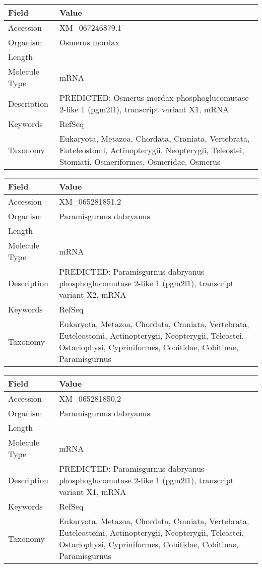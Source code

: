 \documentclass[10pt]{article}
\begin{document}
{\footnotesize
\begin{longtable}{>{\raggedright\arraybackslash}p{4.5cm} >{\raggedright\arraybackslash}p{11.5cm}}
\textbf{Field} & \textbf{Value} \\
\hline
Accession & XM\_067246879.1 \\
Organism & Osmerus mordax \\
Length & 3989 \\
Molecule Type & mRNA \\
Description & PREDICTED: Osmerus mordax phosphoglucomutase 2-like 1 (pgm2l1), transcript variant X1, mRNA \\
Keywords & RefSeq \\
Taxonomy & Eukaryota, Metazoa, Chordata, Craniata, Vertebrata, Euteleostomi, Actinopterygii, Neopterygii, Teleostei, Stomiati, Osmeriformes, Osmeridae, Osmerus \\
\end{longtable}
}

{\footnotesize
\begin{longtable}{>{\raggedright\arraybackslash}p{4.5cm} >{\raggedright\arraybackslash}p{11.5cm}}
\textbf{Field} & \textbf{Value} \\
\hline
Accession & XM\_065281851.2 \\
Organism & Paramisgurnus dabryanus \\
Length & 3599 \\
Molecule Type & mRNA \\
Description & PREDICTED: Paramisgurnus dabryanus phosphoglucomutase 2-like 1 (pgm2l1), transcript variant X2, mRNA \\
Keywords & RefSeq \\
Taxonomy & Eukaryota, Metazoa, Chordata, Craniata, Vertebrata, Euteleostomi, Actinopterygii, Neopterygii, Teleostei, Ostariophysi, Cypriniformes, Cobitidae, Cobitinae, Paramisgurnus \\
\end{longtable}
}

{\footnotesize
\begin{longtable}{>{\raggedright\arraybackslash}p{4.5cm} >{\raggedright\arraybackslash}p{11.5cm}}
\textbf{Field} & \textbf{Value} \\
\hline
Accession & XM\_065281850.2 \\
Organism & Paramisgurnus dabryanus \\
Length & 3754 \\
Molecule Type & mRNA \\
Description & PREDICTED: Paramisgurnus dabryanus phosphoglucomutase 2-like 1 (pgm2l1), transcript variant X1, mRNA \\
Keywords & RefSeq \\
Taxonomy & Eukaryota, Metazoa, Chordata, Craniata, Vertebrata, Euteleostomi, Actinopterygii, Neopterygii, Teleostei, Ostariophysi, Cypriniformes, Cobitidae, Cobitinae, Paramisgurnus \\
\end{longtable}
}
\end{document}

